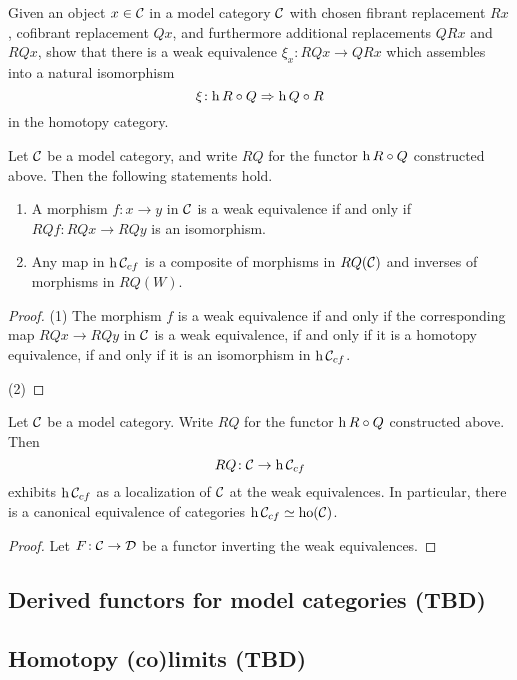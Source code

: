 \begin{exercise}
	Given an object \(x\in\mathcal{C}\) in a model category \(\mathcal{C}\) with chosen fibrant replacement \(Rx\), cofibrant replacement \(Qx\), and furthermore
	additional replacements \(QRx\) and \(RQx\), show that there is a weak equivalence \(\xi_x\!:RQx\to QRx\) which assembles into a natural isomorphism
	\[ \xi\!: \operatorname{h}{R}\circ Q \Rightarrow \operatorname{h}{Q}\circ R \]
	in the homotopy category.
\end{exercise}


\begin{proposition}
	Let \(\mathcal{C}\) be a model category, and write \(RQ\) for the functor \(\operatorname{h}{R}\circ Q\) constructed above. Then the following statements hold.
	\begin{enumerate}[label=(\arabic*)]
		\item A morphism \(f\!:x\to y\) in \(\mathcal{C}\) is a weak equivalence if and only if \(RQf\!:RQx\to RQy\) is an isomorphism.
		\item Any map in \(\operatorname{h}{\mathcal{C}_{cf}}\) is a composite of morphisms in \(RQ(\mathcal{C})\) and inverses of morphisms in \(RQ(W)\).
	\end{enumerate}
\end{proposition}
\begin{proof}
(1) The morphism \(f\) is a weak equivalence if and only if the corresponding map \(RQx\to RQy\) in \(\mathcal{C}\) is a weak equivalence, if and only if it is a homotopy equivalence,
if and only if it is an isomorphism in \(\operatorname{h}{\mathcal{C}_{cf}}\).

(2) 
\end{proof}

\begin{theorem}
	Let \(\mathcal{C}\) be a model category. Write \(RQ\) for the functor \(\operatorname{h}{R}\circ Q\) constructed above. Then
	\[ RQ\!: \mathcal{C} \to \operatorname{h}{\mathcal{C}_{cf}} \]
	exhibits \(\operatorname{h}{\mathcal{C}_{cf}}\) as a localization of \(\mathcal{C}\) at the weak equivalences. In particular, there is a canonical equivalence of categories \(\operatorname{h}{\mathcal{C}_{cf}}\simeq\operatorname{ho}(\mathcal{C})\).
\end{theorem}
\begin{proof}
Let \(F\!:\mathcal{C}\to\mathcal{D}\) be a functor inverting the weak equivalences.
\end{proof}

\subsection{Derived functors for model categories (TBD)}

\subsection{Homotopy (co)limits (TBD)}
